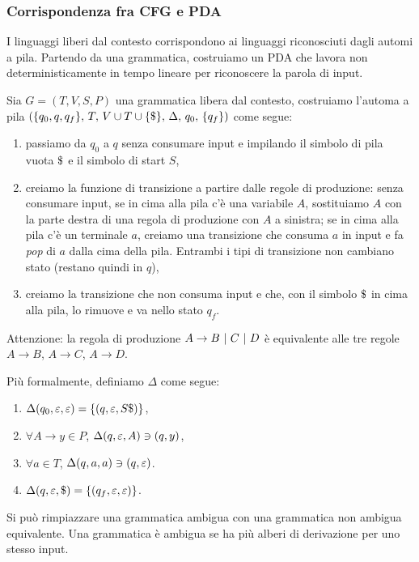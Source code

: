 \subsubsection{Corrispondenza fra CFG e PDA}

I linguaggi liberi dal contesto corrispondono ai linguaggi riconosciuti dagli automi a pila.
Partendo da una grammatica, costruiamo un PDA che lavora non deterministicamente in tempo lineare per riconoscere la parola di input.

Sia $G = (T, V, S, P)$ una grammatica libera dal contesto, costruiamo l'automa a pila $(\{q_0, q, q_f\}, \, T, \, V \cup T \cup \{ \$ \}, \, \Delta, \, q_0, \, \{q_f\})$ come segue:
\begin{enumerate}
	\item passiamo da $q_0$ a $q$ senza consumare input e impilando il simbolo di pila vuota $\stackend$ e il simbolo di start $S$,
	\item creiamo la funzione di transizione a partire dalle regole di produzione: senza consumare input, se in cima alla pila c'\`e una variabile $A$, sostituiamo $A$ con la parte destra di una regola di produzione con $A$ a sinistra; se in cima alla pila c'\`e un terminale $a$, creiamo una transizione che consuma $a$ in input e fa \emph{pop} di $a$ dalla cima della pila. Entrambi i tipi di transizione non cambiano stato (restano quindi in $q$),
	\item creiamo la transizione che non consuma input e che, con il simbolo $\stackend$ in cima alla pila, lo rimuove e va nello stato $q_f$.
\end{enumerate}
Attenzione: la regola di produzione $A \to B \ | \  C \ | \  D$ \`e equivalente alle tre regole $A \to B$, $A \to C$, $A \to D$.

Pi\`u formalmente, definiamo $\Delta$ come segue:
\begin{enumerate}
	\item $\Delta( q_0, \varepsilon, \varepsilon ) = \{ (q, \varepsilon, S \$ )\}$,
	\item $\forall A \to y \in P$, $\Delta (q, \varepsilon, A) \ni (q, y)$,
	\item $\forall a \in T$, $\Delta (q, a, a) \ni (q, \varepsilon)$.
	\item $\Delta (q, \varepsilon, \$) = \{ (q_f, \varepsilon, \varepsilon ) \}$.
\end{enumerate}


Si pu\`o rimpiazzare una grammatica ambigua con una grammatica non ambigua equivalente.
Una grammatica \`e ambigua se ha pi\`u alberi di derivazione per uno stesso input.

